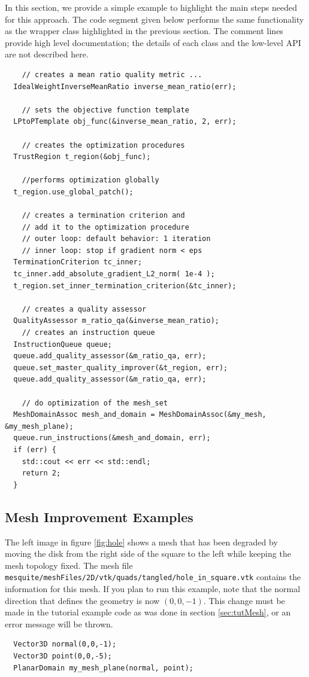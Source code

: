 In this section, we provide a simple example to highlight the main
steps needed for this approach.  The code segment given below performs
the same functionality as the wrapper class highlighted in the
previous section.  The comment lines provide high level documentation;
the details of each class and the low-level API are not described here.

\begin{verbatim}
    // creates a mean ratio quality metric ...
  IdealWeightInverseMeanRatio inverse_mean_ratio(err);

    // sets the objective function template
  LPtoPTemplate obj_func(&inverse_mean_ratio, 2, err);

    // creates the optimization procedures
  TrustRegion t_region(&obj_func);

    //performs optimization globally
  t_region.use_global_patch();

    // creates a termination criterion and
    // add it to the optimization procedure
    // outer loop: default behavior: 1 iteration
    // inner loop: stop if gradient norm < eps
  TerminationCriterion tc_inner;
  tc_inner.add_absolute_gradient_L2_norm( 1e-4 );
  t_region.set_inner_termination_criterion(&tc_inner);

    // creates a quality assessor
  QualityAssessor m_ratio_qa(&inverse_mean_ratio);
    // creates an instruction queue
  InstructionQueue queue;
  queue.add_quality_assessor(&m_ratio_qa, err);
  queue.set_master_quality_improver(&t_region, err);
  queue.add_quality_assessor(&m_ratio_qa, err);

    // do optimization of the mesh_set
  MeshDomainAssoc mesh_and_domain = MeshDomainAssoc(&my_mesh, &my_mesh_plane);
  queue.run_instructions(&mesh_and_domain, err);
  if (err) {
    std::cout << err << std::endl;
    return 2;
  }
\end{verbatim}

\newpage

\subsection{Mesh Improvement Examples}

The left image in figure \ref{fig:hole} shows a mesh that has
been degraded by moving the disk from the right side of the square to
the left while keeping the mesh topology fixed.
The mesh file
\newline
\texttt{mesquite/meshFiles/2D/vtk/quads/tangled/hole\_in\_square.vtk} contains the
information for this mesh.  If you plan to run this example, note that
the normal direction that defines the geometry is now $(0,0,-1)$.
This change must be made in the tutorial example code
as was done in section \ref{sec:tutMesh}, or an error message will be
thrown.
\begin{verbatim}
  Vector3D normal(0,0,-1);
  Vector3D point(0,0,-5);
  PlanarDomain my_mesh_plane(normal, point);
\end{verbatim}

